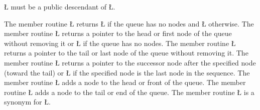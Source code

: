 \documentclass[openright,twoside]{report}
\begin{document}
%
%
%
\LGinlinetrue\LGbegin\lgrinde\L{}\endlgrinde\LGend{} must be a public descendant of \LGinlinetrue\LGbegin\lgrinde\L{}\endlgrinde\LGend{}.

The member routine \LGinlinetrue\LGbegin\lgrinde\L{}\endlgrinde\LGend{} returns \LGinlinetrue\LGbegin\lgrinde\L{}\endlgrinde\LGend{} if the queue has no nodes and \LGinlinetrue\LGbegin\lgrinde\L{}\endlgrinde\LGend{} otherwise.
The member routine \LGinlinetrue\LGbegin\lgrinde\L{}\endlgrinde\LGend{} returns a pointer to the head or first node of the queue without removing it or \LGinlinetrue\LGbegin\lgrinde\L{}\endlgrinde\LGend{} if the queue has no nodes.
The member routine \LGinlinetrue\LGbegin\lgrinde\L{}\endlgrinde\LGend{} returns a pointer to the tail or last node of the queue without removing it.
The member routine \LGinlinetrue\LGbegin\lgrinde\L{}\endlgrinde\LGend{} returns a pointer to the successor node after the specified node (toward the tail) or \LGinlinetrue\LGbegin\lgrinde\L{}\endlgrinde\LGend{} if the specified node is the last node in the sequence.
The member routine \LGinlinetrue\LGbegin\lgrinde\L{}\endlgrinde\LGend{} adds a node to the head or front of the queue.
The member routine \LGinlinetrue\LGbegin\lgrinde\L{}\endlgrinde\LGend{} adds a node to the tail or end of the queue.
The member routine \LGinlinetrue\LGbegin\lgrinde\L{}\endlgrinde\LGend{} is a synonym for \LGinlinetrue\LGbegin\lgrinde\L{}\endlgrinde\LGend{}.
\end{document}
